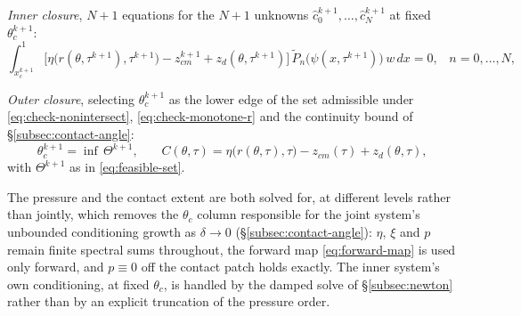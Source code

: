 \emph{Inner closure}, $N+1$ equations for the $N+1$ unknowns $\hat c_0^{k+1},\dots,\hat c_N^{k+1}$ at fixed $\theta_c^{k+1}$:
\begin{equation}
    \int_{x_c^{k+1}}^1\Big[\eta\big(r(\theta,\tau^{k+1}),\tau^{k+1}\big)-z_{cm}^{k+1}+z_d(\theta,\tau^{k+1})\Big]\,\tilde P_n\big(\psi(x,\tau^{k+1})\big)\,w\,dx=0\text{,}\quad n=0,\dots,N\text{,}
    \label{eq:summary-galerkin}
\end{equation}

\emph{Outer closure}, selecting $\theta_c^{k+1}$ as the lower edge of the set admissible under \eqref{eq:check-nonintersect}, \eqref{eq:check-monotone-r} and the continuity bound of \S\ref{subsec:contact-angle}:
\begin{equation}
    \theta_c^{k+1}=\inf\,\Theta^{k+1}\text{,}\qquad
    C(\theta,\tau) = \eta\big(r(\theta,\tau),\tau\big)-z_{cm}(\tau)+z_d(\theta,\tau)\text{,}
    \label{eq:summary-theta-c}
\end{equation}
with $\Theta^{k+1}$ as in \eqref{eq:feasible-set}.

The pressure and the contact extent are both solved for, at different levels rather than jointly, which removes the $\theta_c$ column responsible for the joint system's unbounded conditioning growth as $\delta\to0$ (\S\ref{subsec:contact-angle}): $\eta$, $\xi$ and $p$ remain finite spectral sums throughout, the forward map \eqref{eq:forward-map} is used only forward, and $p\equiv0$ off the contact patch holds exactly. The inner system's own conditioning, at fixed $\theta_c$, is handled by the damped solve of \S\ref{subsec:newton} rather than by an explicit truncation of the pressure order.
